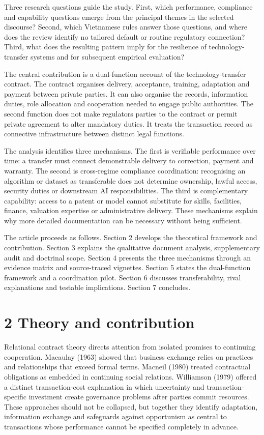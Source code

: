 \documentclass[
]{article}
\begin{document}
Three research questions guide the study. First, which performance,
compliance and capability questions emerge from the principal themes in
the selected discourse? Second, which Vietnamese rules answer those
questions, and where does the review identify no tailored default or
routine regulatory connection? Third, what does the resulting pattern
imply for the resilience of technology-transfer systems and for
subsequent empirical evaluation?

The central contribution is a dual-function account of the
technology-transfer contract. The contract organises delivery,
acceptance, training, adaptation and payment between private parties. It
can also organise the records, information duties, role allocation and
cooperation needed to engage public authorities. The second function
does not make regulators parties to the contract or permit private
agreement to alter mandatory duties. It treats the transaction record as
connective infrastructure between distinct legal functions.

The analysis identifies three mechanisms. The first is verifiable
performance over time: a transfer must connect demonstrable delivery to
correction, payment and warranty. The second is cross-regime compliance
coordination: recognising an algorithm or dataset as transferable does
not determine ownership, lawful access, security duties or downstream AI
responsibilities. The third is complementary capability: access to a
patent or model cannot substitute for skills, facilities, finance,
valuation expertise or administrative delivery. These mechanisms explain
why more detailed documentation can be necessary without being
sufficient.

The article proceeds as follows. Section 2 develops the theoretical
framework and contribution. Section 3 explains the qualitative document
analysis, supplementary audit and doctrinal scope. Section 4 presents
the three mechanisms through an evidence matrix and source-traced
vignettes. Section 5 states the dual-function framework and a
coordination pilot. Section 6 discusses transferability, rival
explanations and testable implications. Section 7 concludes.

\section{2 Theory and contribution}\label{theory-and-contribution}

Relational contract theory directs attention from isolated promises to
continuing cooperation. Macaulay (1963) showed that business exchange
relies on practices and relationships that exceed formal terms. Macneil
(1980) treated contractual obligations as embedded in continuing social
relations. Williamson (1979) offered a distinct transaction-cost
explanation in which uncertainty and transaction-specific investment
create governance problems after parties commit resources. These
approaches should not be collapsed, but together they identify
adaptation, information exchange and safeguards against opportunism as
central to transactions whose performance cannot be specified completely
in advance.
\end{document}
